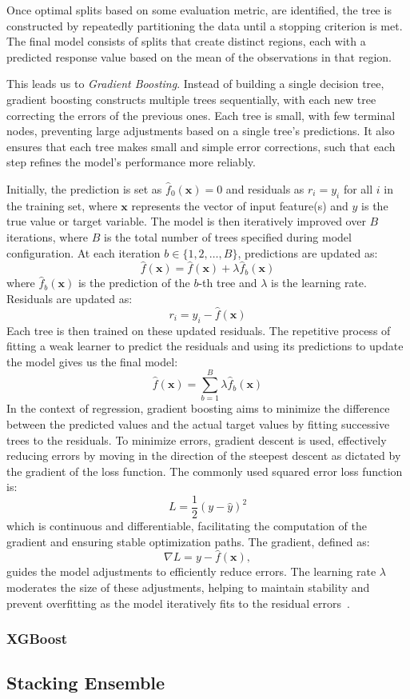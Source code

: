 Once optimal splits based on some evaluation metric, are identified, the tree is constructed by repeatedly partitioning the data until a stopping criterion is met.
The final model consists of splits that create distinct regions, each with a predicted response value based on the mean of the observations in that region.

This leads us to \textit{Gradient Boosting}.
Instead of building a single decision tree, gradient boosting constructs multiple trees sequentially, with each new tree correcting the errors of the previous ones.
Each tree is small, with few terminal nodes, preventing large adjustments based on a single tree's predictions. 
It also ensures that each tree makes small and simple error corrections, such that each step refines the model's performance more reliably.

Initially, the prediction is set as $\hat{f}_0(\mathbf{x}) = 0$ and residuals as $r_i = y_i$ for all $i$ in the training set, where $\mathbf{x}$ represents the vector of input feature(s) and $y$ is the true value or target variable. 
The model is then iteratively improved over $B$ iterations, where $B$ is the total number of trees specified during model configuration. 
At each iteration $b \in \{1, 2, \ldots, B\}$, predictions are updated as:
$$
    \hat{f}(\mathbf{x}) = \hat{f}(\mathbf{x}) + \lambda \hat{f}_b(\mathbf{x})
$$
where $\hat{f}_b(\mathbf{x})$ is the prediction of the $b$-th tree and $\lambda$ is the learning rate. Residuals are updated as:
$$
    r_i = y_i - \hat{f}(\mathbf{x})
$$
Each tree is then trained on these updated residuals. 
The repetitive process of fitting a weak learner to predict the residuals and using its predictions to update the model gives us the final model:
$$
    \hat{f}(\mathbf{x}) = \sum_{b=1}^{B} \lambda \hat{f}_b(\mathbf{x}) 
$$
In the context of regression, gradient boosting aims to minimize the difference between the predicted values and the actual target values by fitting successive trees to the residuals. To minimize errors, gradient descent is used, effectively reducing errors by moving in the direction of the steepest descent as dictated by the gradient of the loss function. The commonly used squared error loss function is:
$$
L = \frac{1}{2}(y - \hat{y})^2
$$
which is continuous and differentiable, facilitating the computation of the gradient and ensuring stable optimization paths. 
The gradient, defined as:
$$
    \nabla L = y - \hat{f}(\mathbf{x}),
$$
guides the model adjustments to efficiently reduce errors. 
The learning rate $\lambda$ moderates the size of these adjustments, helping to maintain stability and prevent overfitting as the model iteratively fits to the residual errors~\cite{gradientLossFunction}.



\subsubsection{XGBoost}

\subsection{Stacking Ensemble}

